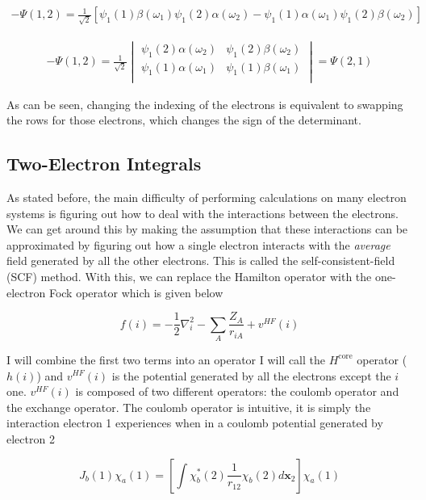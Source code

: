\documentclass[12pt]{report}
\begin{document}
\begin{align}
\label{eq:pauli_2t_3}
-\Psi(1,2) =
\frac{1}{\sqrt{2}}
\left[
\psi_{1}(1)\beta(\omega_{1})\psi_{1}(2)\alpha(\omega_{2}) -
\psi_{1}(1)\alpha(\omega_{1})\psi_{1}(2)\beta(\omega_{2})
\right]
\end{align}

\begin{align}
\label{eq:pauli_2t_1}
-\Psi(1,2) =
\frac{1}{\sqrt{2}}
\begin{vmatrix}
\psi_{1}(2)\alpha(\omega_{2})	&	\psi_{1}(2)\beta(\omega_{2})	\\
\psi_{1}(1)\alpha(\omega_{1})	&	\psi_{1}(1)\beta(\omega_{1})	\\
\end{vmatrix}
=\Psi(2,1)
\end{align}

As can be seen, changing the indexing of the electrons is equivalent to swapping the rows for those electrons, which changes the sign of the determinant.

\subsection{Two-Electron Integrals}
As stated before, the main difficulty of performing calculations on many electron systems is figuring out how to deal with the interactions between the electrons. We can get around this by making the assumption that these interactions can be approximated by figuring out how a single electron interacts with the \textit{average} field generated by all the other electrons. This is called the self-consistent-field (SCF) method. With this, we can replace the Hamilton operator with the one-electron Fock operator which is given below

\begin{equation}
\label{eq:fock_op}
f(i) = -\frac{1}{2}\nabla^{2}_{i}  - \sum_{A}\frac{Z_{A}}{r_{iA}} + v^{HF}(i)
\end{equation} 

I will combine the first two terms into an operator I will call the $H^{\text{core}}$ operator ($h(i)$) and $v^{HF}(i)$ is the potential generated by all the electrons except the $i$ one. $v^{HF}(i)$ is composed of two different operators: the coulomb operator and the exchange operator. The coulomb operator is intuitive, it is simply the interaction electron 1 experiences when in a coulomb potential generated by electron 2

\begin{equation}
\label{eq:coulomb_op}
J_{b}(1)\chi_{a}(1)=\left[\int\chi^{*}_{b}(2)\frac{1}{r_{12}}\chi_{b}(2)d\textbf{x}_{2}\right]\chi_{a}(1)
\end{equation} 
\end{document}
